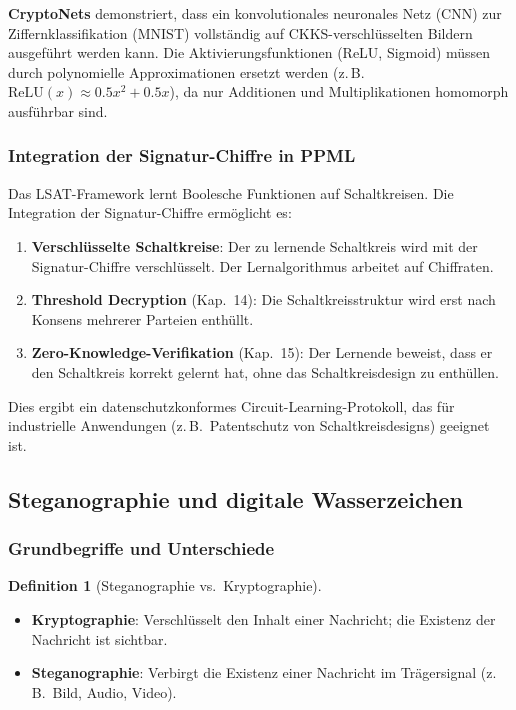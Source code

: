 ﻿\documentclass[a4paper,12pt]{scrreprt}
\theoremstyle{definition}
\newtheorem{definition}{Definition}[section]
\begin{document}
\textbf{CryptoNets} \cite{GLP+21} demonstriert, dass ein konvolutionales neuronales Netz (CNN) zur Ziffernklassifikation (MNIST) vollständig auf CKKS-verschlüsselten Bildern ausgeführt werden kann. Die Aktivierungsfunktionen (ReLU, Sigmoid) müssen durch polynomielle Approximationen ersetzt werden (z.\,B.\ $\mathrm{ReLU}(x) \approx 0.5x^2 + 0.5x$), da nur Additionen und Multiplikationen homomorph ausführbar sind.

\subsubsection{Integration der Signatur-Chiffre in PPML}

Das LSAT-Framework \cite{Epp26d} lernt Boolesche Funktionen auf Schaltkreisen. Die Integration der Signatur-Chiffre ermöglicht es:

\begin{enumerate}
    \item \textbf{Verschlüsselte Schaltkreise}: Der zu lernende Schaltkreis wird mit der Signatur-Chiffre verschlüsselt. Der Lernalgorithmus arbeitet auf Chiffraten.
    \item \textbf{Threshold Decryption} (Kap.~14): Die Schaltkreisstruktur wird erst nach Konsens mehrerer Parteien enthüllt.
    \item \textbf{Zero-Knowledge-Verifikation} (Kap.~15): Der Lernende beweist, dass er den Schaltkreis korrekt gelernt hat, ohne das Schaltkreisdesign zu enthüllen.
\end{enumerate}

Dies ergibt ein datenschutzkonformes Circuit-Learning-Protokoll, das für industrielle Anwendungen (z.\,B.\ Patentschutz von Schaltkreisdesigns) geeignet ist.

\subsection{Steganographie und digitale Wasserzeichen}

\subsubsection{Grundbegriffe und Unterschiede}

\begin{definition}[Steganographie vs.\ Kryptographie]
\begin{itemize}
    \item \textbf{Kryptographie}: Verschlüsselt den Inhalt einer Nachricht; die Existenz der Nachricht ist sichtbar.
    \item \textbf{Steganographie}: Verbirgt die Existenz einer Nachricht im Trägersignal (z.\,B.\ Bild, Audio, Video).
\end{itemize}
\end{definition}
\end{document}
